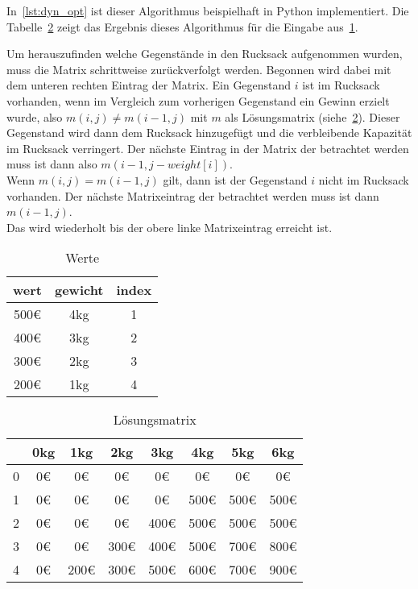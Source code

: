 \documentclass[12pt, a4paper, ngerman]{article}
\begin{document}
In~\ref{lst:dyn_opt} ist dieser Algorithmus beispielhaft in Python implementiert.
Die Tabelle~\ref{tab:mat} zeigt das Ergebnis dieses Algorithmus für die Eingabe aus~\ref{tab:input}.

Um herauszufinden welche Gegenstände in den Rucksack aufgenommen wurden,
muss die Matrix schrittweise zurückverfolgt werden.
Begonnen wird dabei mit dem unteren rechten Eintrag der Matrix.
Ein Gegenstand \(i\) ist im Rucksack vorhanden,
wenn im Vergleich zum vorherigen Gegenstand ein Gewinn erzielt wurde,
also \(m(i,j)\neq m(i-1,j)\) mit \(m\) als Lösungsmatrix (siehe~\ref{tab:mat}).
Dieser Gegenstand wird dann dem Rucksack hinzugefügt
und die verbleibende Kapazität im Rucksack verringert.
Der nächste Eintrag in der Matrix der betrachtet werden muss
ist dann also \(m(i-1,j-weight[i])\).\\
Wenn \(m(i,j) = m(i-1,j)\) gilt,
dann ist der Gegenstand \(i\) nicht im Rucksack vorhanden.
Der nächste Matrixeintrag der betrachtet werden muss ist dann \(m(i-1,j)\).\\
Das wird wiederholt bis der obere linke Matrixeintrag erreicht ist.


\begin{table}
  \renewcommand{\arraystretch}{1.2}
  \centering
  \begin{tabular}{c|c|c}
    wert & gewicht & index \\
    \hline
    500€ & 4kg     & 1     \\
    400€ & 3kg     & 2     \\
    300€ & 2kg     & 3     \\
    200€ & 1kg     & 4
  \end{tabular}
  \caption{Werte}
  \label{tab:input}
\end{table}

\begin{table}
  \renewcommand{\arraystretch}{1.2}
  \centering
  \begin{tabular}{c |c c c c c c c}
      & 0kg & 1kg  & 2kg  & 3kg  & 4kg  & 5kg  & 6kg  \\
    \hline
    0 & 0€  & 0€   & 0€   & 0€   & 0€   & 0€   & 0€   \\
    1 & 0€  & 0€   & 0€   & 0€   & 500€ & 500€ & 500€ \\
    2 & 0€  & 0€   & 0€   & 400€ & 500€ & 500€ & 500€ \\
    3 & 0€  & 0€   & 300€ & 400€ & 500€ & 700€ & 800€ \\
    4 & 0€  & 200€ & 300€ & 500€ & 600€ & 700€ & 900€
  \end{tabular}
  \caption{Lösungsmatrix}
  \label{tab:mat}
\end{table}
\end{document}
